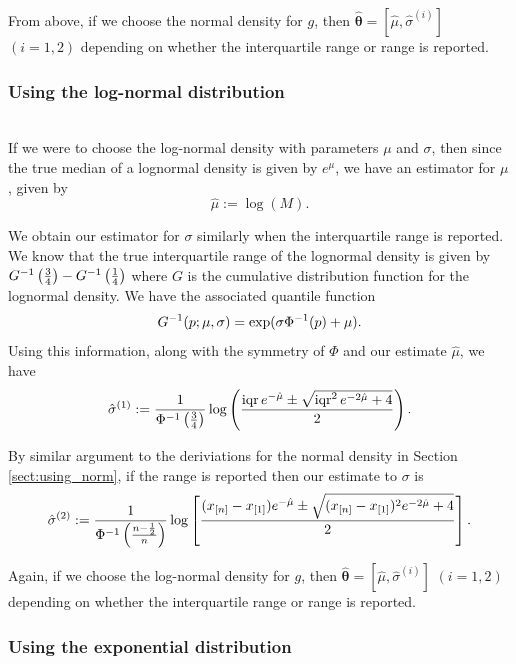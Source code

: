 \documentclass{article}
\begin{document}
From above, if we choose the normal density for $g$, then $\hat{\bm{\theta}}=[\hat \mu, \hat{\sigma}^{(i)}]$ $(i=1,2)$ depending on whether the interquartile range or range is reported.

\subsubsection{Using the log-normal distribution}~\\

\noindent If we were to choose the log-normal density with parameters $\mu$ and $\sigma$, then since the true median of a lognormal density is given by $e^\mu$, we have an estimator for $\mu$, given by
\begin{equation*}\label{mu-hat}
\hat \mu := \log(M).
\end{equation*}

We obtain our estimator for $\sigma$ similarly when the interquartile range is reported. We know that the true interquartile range of the lognormal density is given by $G^{-1}\left(\frac 3 4\right) - G^{-1}\left(\frac 1 4\right)$ where $G$ is the cumulative distribution function for the lognormal density. We have the associated quantile function
\[
G^{-1}(p; \mu, \sigma) = \exp(\sigma\Phi^{-1}(p) + \mu).
\]
Using this information, along with the symmetry of $\Phi$ and our estimate $\hat \mu$, we have
\begin{equation*}\label{sigma-hat}
\hat{\sigma}^{(1)} := \frac 1 {\Phi^{-1}\left(\frac 3 4\right)} \log\left(\frac {\operatorname{iqr} e^{- \hat \mu} \pm
\sqrt{\operatorname{iqr}^2 e^{-2 \hat \mu} + 4}
} {2}\right).
\end{equation*}

By similar argument to the deriviations for the normal density in Section \ref{sect:using_norm}, if the range is reported then our estimate to $\sigma$ is
\begin{equation*}\label{sigma-hat-range}
\hat{\sigma}^{(2)} := \frac 1 {\Phi^{-1}\left(\frac {n - \frac 1 2} n\right)} \log\left[\frac {(x_{[n]} - x_{[1]}) e^{- \hat \mu} \pm
\sqrt{(x_{[n]} - x_{[1]})^2 e^{-2\hat \mu} + 4}
} {2}\right].
\end{equation*}

Again, if we choose the log-normal density for $g$, then $\hat{\bm{\theta}}=[\hat \mu, \hat{\sigma}^{(i)}]$ $(i=1,2)$ depending on whether the interquartile range or range is reported.

\subsubsection{Using the exponential distribution} ~\\
\end{document}
